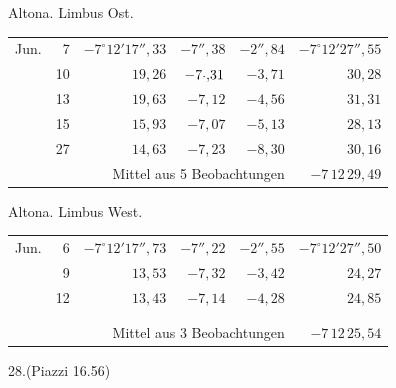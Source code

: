\noindent\begin{minipage}[t]{.495\textwidth}\centering Altona. Limbus Ost.\par\smallskip
{\scriptsize\setlength{\tabcolsep}{1pt}\renewcommand{\arraystretch}{1.2}\begin{tabular}{lr|r|r|r|r|}
Jun.&7&$-7^\circ12'17''{,}33$&$-7''{,}38$&$-2''{,}84$&$-7^\circ12'27''{,}55$\\
&10&$19{,}26$&$-7\mathord{\text{\raisebox{.3ex}{.}}}{,}31$&$-3{,}71$&$30{,}28$\\
&13&$19{,}63$&$-7{,}12$&$-4{,}56$&$31{,}31$\\
&15&$15{,}93$&$-7{,}07$&$-5{,}13$&$28{,}13$\\
&27&$14{,}63$&$-7{,}23$&$-8{,}30$&$30{,}16$\\
\cline{6-6}\multicolumn{5}{r}{Mittel aus 5 Beobachtungen}&$-7\,12\,29{,}49$
\end{tabular}}\end{minipage}\hfill\begin{minipage}[t]{.495\textwidth}\centering Altona. Limbus West.\par\smallskip
{\scriptsize\setlength{\tabcolsep}{1pt}\renewcommand{\arraystretch}{1.2}\begin{tabular}{lr|r|r|r|r}
Jun.&6&$-7^\circ12'17''{,}73$&$-7''{,}22$&$-2''{,}55$&$-7^\circ12'27''{,}50$\\
&9&$13{,}53$&$-7{,}32$&$-3{,}42$&$24{,}27$\\
&12&$13{,}43$&$-7{,}14$&$-4{,}28$&$24{,}85$\\
&&&&&\\
&&&&&\\
\cline{6-6}\multicolumn{5}{r}{Mittel aus 3 Beobachtungen}&$-7\,12\,25{,}54$
\end{tabular}}\end{minipage}
\par\vspace{4mm}
\begin{center}28.\quad (Piazzi 16.56)\end{center}

